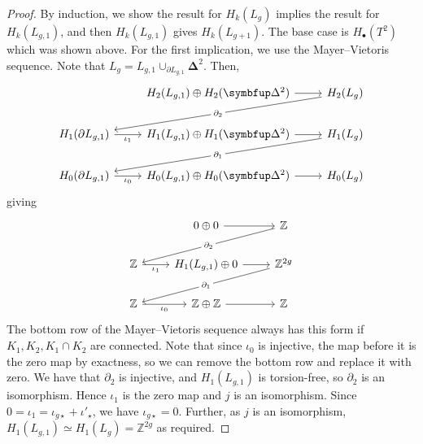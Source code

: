 \begin{proof}
	By induction, we show the result for \( H_k(L_g) \) implies the result for \( H_k(L_{g,1}) \), and then \( H_k(L_{g,1}) \) gives \( H_k(L_{g+1}) \).
	The base case is \( H_\bullet(T^2) \) which was shown above.
	For the first implication, we use the Mayer--Vietoris sequence.
	Note that \( L_g = L_{g,1} \cup_{\partial L_{g,1}} \bm\Delta^2 \).
	Then,
	\[\begin{tikzcd}
		& {H_2(L_{g,1}) \oplus H_2(\bm\Delta^2)} & {H_2(L_g)} \\
		{H_1(\partial L_{g,1})} & {H_1(L_{g,1}) \oplus H_1(\bm\Delta^2)} & {H_1(L_g)} \\
		{H_0(\partial L_{g,1})} & {H_0(L_{g,1}) \oplus H_0(\bm\Delta^2)} & {H_0(L_g)}
		\arrow[from=1-2, to=1-3]
		\arrow["{\partial_2}"{description}, from=1-3, to=2-1]
		\arrow["{\iota_1}"', from=2-1, to=2-2]
		\arrow[from=2-2, to=2-3]
		\arrow["{\partial_1}"{description}, from=2-3, to=3-1]
		\arrow["{\iota_0}"', from=3-1, to=3-2]
		\arrow[from=3-2, to=3-3]
	\end{tikzcd}\]
	giving
	\[\begin{tikzcd}
		& {0 \oplus 0} & {\mathbb Z} \\
		{\mathbb Z} & {H_1(L_{g,1}) \oplus 0} & {\mathbb Z^{2g}} \\
		{\mathbb Z} & {\mathbb Z \oplus \mathbb Z} & {\mathbb Z}
		\arrow[from=1-2, to=1-3]
		\arrow["{\partial_2}"{description}, from=1-3, to=2-1]
		\arrow["{\iota_1}"', from=2-1, to=2-2]
		\arrow[from=2-2, to=2-3]
		\arrow["{\partial_1}"{description}, from=2-3, to=3-1]
		\arrow["{\iota_0}"', from=3-1, to=3-2]
		\arrow[from=3-2, to=3-3]
	\end{tikzcd}\]
	The bottom row of the Mayer--Vietoris sequence always has this form if \( K_1, K_2, K_1 \cap K_2 \) are connected.
	Note that since \( \iota_0 \) is injective, the map before it is the zero map by exactness, so we can remove the bottom row and replace it with zero.
	We have that \( \partial_2 \) is injective, and \( H_1(L_{g,1}) \) is torsion-free, so \( \partial_2 \) is an isomorphism.
	Hence \( \iota_1 \) is the zero map and \( j \) is an isomorphism.
	Since \( 0 = \iota_1 = \iota_{g\star} + \iota'_\star \), we have \( \iota_{g\star} = 0 \).
	Further, as \( j \) is an isomorphism, \( H_1(L_{g,1}) \simeq H_1(L_g) = \mathbb Z^{2g} \) as required.


\end{proof}
